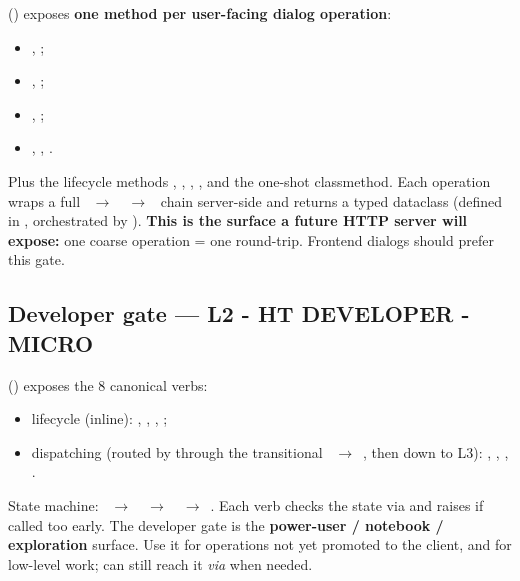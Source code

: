  () exposes \textbf{one method per user-facing dialog operation}:

\begin{itemize}
    \item {}, ;
    \item {}, ;
    \item {}, ;
    \item {}, , .
\end{itemize}

Plus the lifecycle methods , , , , and the one-shot  classmethod. Each operation wraps a full ~$\rightarrow$~~$\rightarrow$~ chain server-side and returns a typed  dataclass (defined in , orchestrated by ). \textbf{This is the surface a future HTTP server will expose:} one coarse operation = one round-trip. Frontend dialogs should prefer this gate.

\subsection{Developer gate --- L2 - HT DEVELOPER - MICRO}

 () exposes the 8 canonical verbs:

\begin{itemize}
    \item lifecycle (inline): , , , ;
    \item dispatching (routed by  through the transitional ~$\rightarrow$~, then down to L3): , , , .
\end{itemize}

State machine: ~$\rightarrow$~~$\rightarrow$~~$\rightarrow$~. Each verb checks the state via  and raises  if called too early. The developer gate is the \textbf{power-user / notebook / exploration} surface. Use it for operations not yet promoted to the client, and for low-level work;  can still reach it \textit{via}  when needed.

